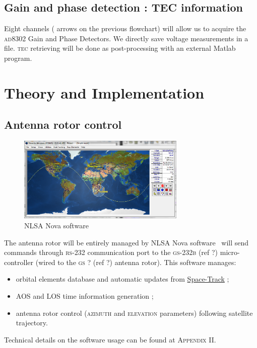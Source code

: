 \documentclass[twocolumn,pre,floats,aps,amsmath,amssymb]{revtex4}
\newenvironment{remark}[1][Remarque.]{\begin{trivlist}
\item[\hskip \labelsep {\bfseries #1}]}{\end{trivlist}}
\begin{document}
\subsection{Gain and phase detection : TEC information}

Eight channels ({ \color{oneblue}{blue} } arrows on the previous flowchart) will allow us to acquire the \textsc{ad8302} Gain and Phase Detectors. We directly save voltage measurements in a file. \textsc{tec} retrieving will be done as post-processing with an external Matlab program.

\section{Theory and Implementation}
\label{sec:theory}

\subsection{Antenna rotor control}

\begin{figure}[h]
  \includegraphics[width=8cm]{pictures/nova3.png}
\caption{NLSA Nova software}
\label{fig:nlsa_nova}
\end{figure}

The antenna rotor will be entirely managed by NLSA Nova software~\cite{nova_um} will send commands through \textsc{rs-232} communication port to the \textsc{gs-232b} (ref ?) micro-controller (wired to the \textsc{gs ?} (ref ?) antenna rotor). This software manages:
\begin {itemize}
\item {orbital elements database and automatic updates from \href{https://www.space-track.org}{Space-Track} ;}
\item {AOS and LOS time information generation ;}
\item {antenna rotor control (\textsc{azimuth} and \textsc{elevation} parameters) following satellite trajectory.}
\end {itemize}

\begin{remark}
  Technical details on the software usage can be found at \textsc{Appendix II}.
\end{remark}
\end{document}
